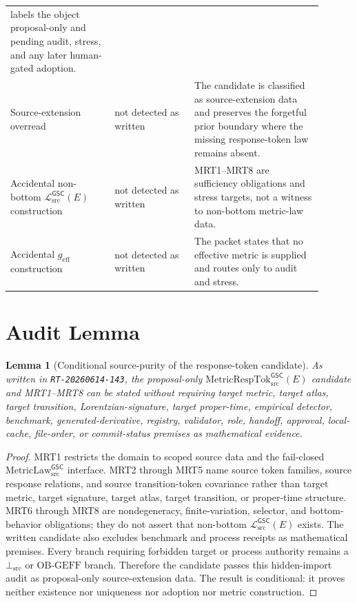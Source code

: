 \documentclass[11pt]{article}
\newcommand{\MetricLaw}{\mathrm{MetricLaw}_{\mathrm{src}}^{\mathsf{GSC}}}
\newcommand{\MetricRespTok}{\mathrm{MetricRespTok}_{\mathrm{src}}^{\mathsf{GSC}}}
\newcommand{\MetricData}{\mathcal{L}_{\mathrm{src}}^{\mathsf{GSC}}}
\newcommand{\BottomSrc}{\bot_{\mathrm{src}}}
\newcommand{\OBGEFF}{\mathrm{OB\mbox{-}GEFF}}
\newcommand{\geff}{g_{\mathrm{eff}}}
\newtheorem{lemma}{Lemma}
\begin{document}
\begin{longtable}{p{0.30\linewidth}p{0.23\linewidth}p{0.37\linewidth}}
labels the object proposal-only and pending audit, stress, and any later
human-gated adoption. \\
Source-extension overread & not detected as written & The candidate is
classified as source-extension data and preserves the forgetful prior boundary
where the missing response-token law remains absent. \\
Accidental non-bottom \(\MetricData(E)\) construction & not detected as written
& MRT1--MRT8 are sufficiency obligations and stress targets, not a witness to
non-bottom metric-law data. \\
Accidental \(\geff\) construction & not detected as written & The packet
states that no effective metric is supplied and routes only to audit and
stress. \\
\bottomrule
\end{longtable}

\section{Audit Lemma}

\begin{lemma}[Conditional source-purity of the response-token candidate]
As written in \texttt{RT-20260614-143}, the proposal-only
\(\MetricRespTok(E)\) candidate and MRT1--MRT8 can be stated without requiring
target metric, target atlas, target transition, Lorentzian-signature,
target proper-time, empirical detector, benchmark, generated-derivative,
registry, validator, role, handoff, approval, local-cache, file-order, or
commit-status premises as mathematical evidence.
\end{lemma}

\begin{proof}
MRT1 restricts the domain to scoped source data and the fail-closed
\(\MetricLaw\) interface. MRT2 through MRT5 name source token families,
source response relations, and source transition-token covariance rather than
target metric, target signature, target atlas, target transition, or
proper-time structure. MRT6 through MRT8 are nondegeneracy, finite-variation,
selector, and bottom-behavior obligations; they do not assert that non-bottom
\(\MetricData(E)\) exists. The written candidate also excludes benchmark and
process receipts as mathematical premises. Every branch requiring forbidden
target or process authority remains a \(\BottomSrc\) or \(\OBGEFF\) branch.
Therefore the candidate passes this hidden-import audit as proposal-only
source-extension data. The result is conditional: it proves neither existence
nor uniqueness nor adoption nor metric construction.
\end{proof}
\end{document}
